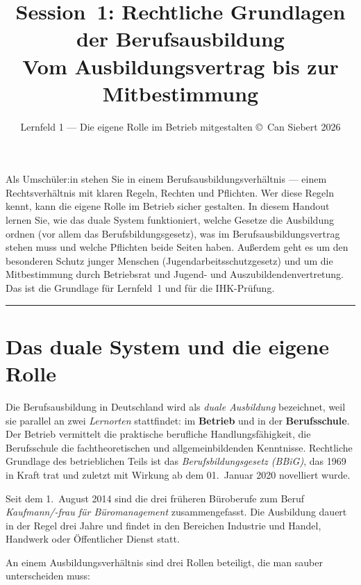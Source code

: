 \documentclass[11pt, a4paper]{article}
\title{\vspace*{-1.5cm}\Huge\bfseries\color{bfwPrimaryDark}Session~1: Rechtliche Grundlagen der Berufsausbildung\\[0.4em]
  \large\color{bfwInkSoft}\textnormal{Vom Ausbildungsvertrag bis zur Mitbestimmung}}
\author{\textsf{Lernfeld 1 --- Die eigene Rolle im Betrieb mitgestalten \textperiodcentered{} \small\copyright\ Can Siebert\,\textperiodcentered\,2026}}
\date{}
\begin{document}
\maketitle
\thispagestyle{empty}

\vspace{1em}
\begin{merksatz}[title={\bfseries Worum geht es in dieser Session?}]
Als Umschüler:in stehen Sie in einem Berufsausbildungsverhältnis --- einem Rechtsverhältnis
mit klaren Regeln, Rechten und Pflichten. Wer diese Regeln kennt, kann die eigene Rolle im
Betrieb sicher gestalten. In diesem Handout lernen Sie, wie das duale System funktioniert,
welche Gesetze die Ausbildung ordnen (vor allem das Berufsbildungsgesetz), was im
Berufsausbildungsvertrag stehen muss und welche Pflichten beide Seiten haben. Außerdem
geht es um den besonderen Schutz junger Menschen (Jugendarbeitsschutzgesetz) und um die
Mitbestimmung durch Betriebsrat und Jugend- und Auszubildendenvertretung. Das ist die
Grundlage für Lernfeld~1 und für die IHK-Prüfung.
\end{merksatz}

\tableofcontents
\vspace{1em}
\hrule
\vspace{1em}

\section{Das duale System und die eigene Rolle}

Die Berufsausbildung in Deutschland wird als \emph{duale Ausbildung} bezeichnet, weil sie
parallel an zwei \emph{Lernorten} stattfindet: im \textbf{Betrieb} und in der
\textbf{Berufsschule}. Der Betrieb vermittelt die praktische berufliche Handlungsfähigkeit,
die Berufsschule die fachtheoretischen und allgemeinbildenden Kenntnisse. Rechtliche
Grundlage des betrieblichen Teils ist das \emph{Berufsbildungsgesetz (BBiG)}, das 1969 in
Kraft trat und zuletzt mit Wirkung ab dem 01.\ Januar 2020 novelliert wurde.

Seit dem 1.\ August 2014 sind die drei früheren Büroberufe zum Beruf
\emph{Kaufmann/-frau für Büromanagement} zusammengefasst. Die Ausbildung dauert in der
Regel drei Jahre und findet in den Bereichen Industrie und Handel, Handwerk oder
Öffentlicher Dienst statt.

An einem Ausbildungsverhältnis sind drei Rollen beteiligt, die man sauber unterscheiden
muss:
\end{document}
